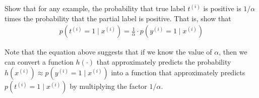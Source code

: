 \item {} 
Show that for any example, the probability that true label $t^{(i)}$ is positive is $1/\alpha$ times  the probability that the partial label is positive. 
That is, show that
\begin{align}p(t^{(i)} = 1\mid x^{(i)}) = \frac{1}{\alpha}\cdot p(y^{(i)} = 1\mid x^{(i)})\label{eqn:3} \end{align}

Note that the equation above suggests that if we know the value of $\alpha$, then we can convert a function $h(\cdot)$ that approximately predicts the probability $h(x^{(i)}) \approx p(y^{(i)}=1\mid x^{(i)})$ into a function that approximately predicts $p(t^{(i)} = 1\mid x^{(i)}) $ by multiplying the factor $1/\alpha$. 


